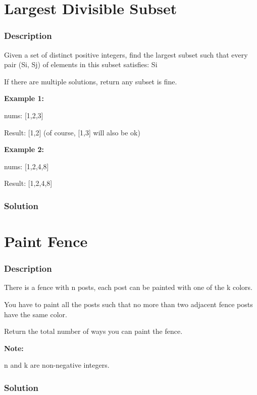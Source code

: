 \newpage

\section{Largest Divisible Subset} %

\subsubsection{Description}
Given a set of distinct positive integers, find the largest subset such that every pair (Si, Sj) of elements in this subset satisfies: Si %

If there are multiple solutions, return any subset is fine.

\textbf{Example 1:}

nums: [1,2,3]

Result: [1,2] (of course, [1,3] will also be ok)

\textbf{Example 2:}

nums: [1,2,4,8]

Result: [1,2,4,8]
\subsubsection{Solution}

\begin{Code}

\end{Code}

\newpage

\section{Paint Fence} %

\subsubsection{Description}
There is a fence with n posts, each post can be painted with one of the k colors.

You have to paint all the posts such that no more than two adjacent fence posts have the same color.

Return the total number of ways you can paint the fence.

\textbf{Note:}

n and k are non-negative integers.

\subsubsection{Solution}

